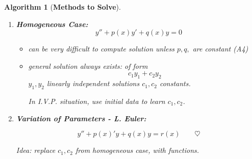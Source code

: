 \documentclass[12pt]{article}
\theoremstyle{plain}
\newtheorem{algorithm}{Algorithm}[subsection]
\begin{document}
	\begin{algorithm}[\textbf{Methods to Solve}]
	$ $
	\begin{enumerate}
		\item \textbf{Homogeneous Case: }
		\[
			y'' + p(x)y' + q(x)y = 0
		\]
		\begin{itemize}
			\item can be very difficult to compute solution unless $p, q,$ are
				constant (A4)
			\item general solution always exists: of form 
				\[
					c_1y_1 + c_2y_2
				\]
				$y_1, y_2$ linearly independent solutions $c_1, c_2$ constants. 
			
				In I.V.P. situation, use initial data to learn $c_1, c_2$.
		\end{itemize}
		
	\item \textbf{Variation of Parameters - L. Euler:}
		
		\[
			y'' + p(x)'y + q(x) y = r(x)  \qquad \heartsuit
		\]

		Idea: replace $c_1, c_2$ from homogeneous case, with functions. 


\end{enumerate}
\end{algorithm}
\end{document}
